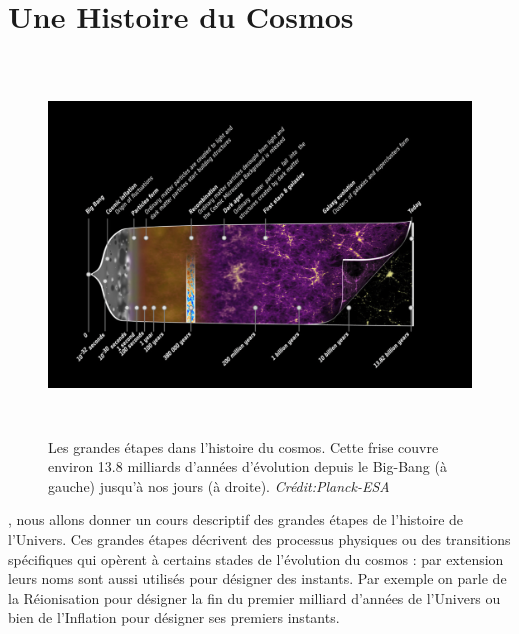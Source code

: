 \section{Une Histoire du Cosmos}
\begin{figure}[htbp]
	\centering
		\includegraphics[height=10cm]{figs/timeline.png}
		\caption[Les grandes étapes dans l'histoire du cosmos]{Les grandes étapes dans l'histoire du cosmos. Cette frise couvre environ 13.8 milliards d'années d'évolution depuis le Big-Bang (à gauche) jusqu'à nos jours (à droite). \textit{Crédit:Planck-ESA}}
	\label{f:timeline}
\end{figure}

, nous allons donner un cours descriptif des grandes étapes de l'histoire de l'Univers. Ces grandes étapes décrivent des processus physiques ou des transitions spécifiques qui opèrent à certains stades de l'évolution du cosmos : par extension leurs noms sont aussi utilisés pour désigner des instants. Par exemple on parle de la Réionisation pour désigner la fin du premier milliard d'années de l'Univers ou bien de l'Inflation pour désigner ses premiers instants.

